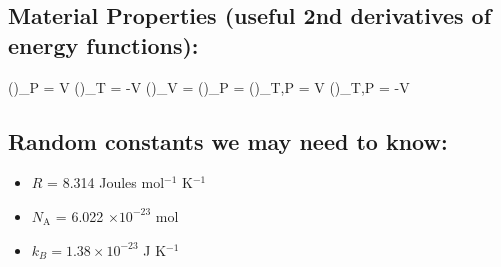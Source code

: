 \documentclass[12pt]{article}
\begin{document}
\subsection{Material Properties (useful 2nd derivatives of energy functions):}
\eqs
{} \left(\right)_P = V \alpha
\eqe
\eqs
{} \left(\right)_T = -V \beta
\eqe
\eqs
{} \left(\right)_V = 
\eqe
\eqs
{} \left(\right)_P = 
\eqe
\eqs
{} \left(\right)_{T,P} = V \gamma
\eqe
\eqs
{} \left(\right)_{T,P} = -V \chi
\eqe

\subsection{Random constants we may need to know:}
\begin{itemize}
\item $R$ = 8.314 Joules mol$^{-1}$ K$^{-1}$
\item $N_\text{A}$ = 6.022 $\times 10^{-23}$ mol
\item $k_B = 1.38 \times 10^{-23}$ J K$^{-1}$


\end{itemize}
\end{document}
